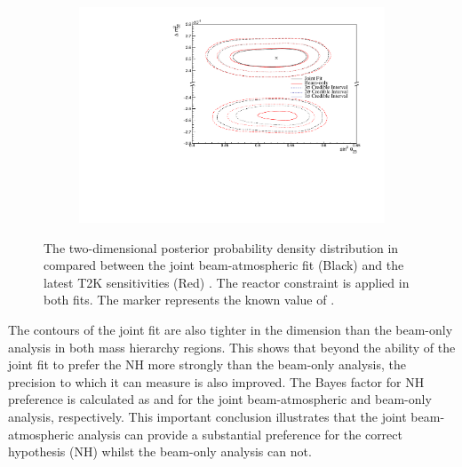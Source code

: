 \begin{figure}[h]
  \begin{subfigure}[t]{0.98\textwidth}
    \includegraphics[width=\textwidth, trim={0mm 0mm 0mm 0mm}, clip,page=1]{Figures/OA/JointFit_OA2020_wRC_Comp/ContourComparison_2D_th23_dm32_BH_1_wRC_UnSmeared_CredibleInterval.pdf}
  \end{subfigure}
  \caption{The two-dimensional posterior probability density distribution in  compared between the joint beam-atmospheric fit (Black) and the latest T2K sensitivities (Red) \cite{Dunne2020-uf, t2k_tn_393}. The reactor constraint is applied in both fits. The marker represents the known value of .}
  \label{fig:OscillationAnalysis_JointFit_OA2020_wRC_TH23DM32}
\end{figure}

The contours of the joint fit are also tighter in the  dimension than the beam-only analysis in both mass hierarchy regions. This shows that beyond the ability of the joint fit to prefer the NH more strongly than the beam-only analysis, the precision to which it can measure  is also improved. The Bayes factor for NH preference is calculated as  and  for the joint beam-atmospheric and beam-only analysis, respectively. This important conclusion illustrates that the joint beam-atmospheric analysis can provide a substantial preference for the correct hypothesis (NH) whilst the beam-only analysis can not.

